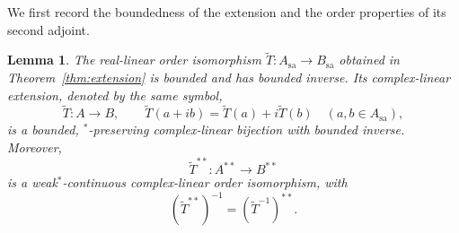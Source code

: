 \documentclass[12pt]{amsart}
\newtheorem{lemma}[theorem]{Lemma}
\theoremstyle{remark}
\newcommand{\sa}{\mathrm{sa}}
\begin{document}
We first record the boundedness of the extension and the order
properties of its second adjoint.


\begin{lemma}\label{lem:bounded-bidual}
The real-linear order isomorphism
$\widetilde T:A_{\sa}\to B_{\sa}$ obtained in
Theorem~\ref{thm:extension} is bounded and has bounded inverse.
Its complex-linear extension, denoted by the same symbol,
\[
    \widetilde T:A\longrightarrow B,\qquad
    \widetilde T(a+ib)=\widetilde T(a)+i\widetilde T(b)
    \quad(a,b\in A_{\sa}),
\]
is a bounded, $^*$-preserving complex-linear bijection with bounded
inverse. Moreover,
\[
    \widetilde T^{**}:A^{**}\longrightarrow B^{**}
\]
is a weak$^*$-continuous complex-linear order isomorphism, with
\[
    (\widetilde T^{**})^{-1}
    =(\widetilde T^{-1})^{**}.
\]
\end{lemma}
\end{document}

